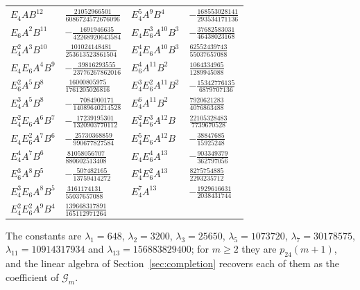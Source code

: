 \documentclass[11pt]{amsart}
\theoremstyle{definition}
\newcommand{\pf}{p_{24}}
\begin{document}
{\small\begin{tabular}{@{}l@{\ \ }l@{\qquad}l@{\ \ }l@{}}
$E_4 A B^{12}$ & $\tfrac{21052966501}{6086724572676096}$ & $E_4^{5} A^{9} B^{4}$ & $-\tfrac{168553028141}{293534171136}$ \\
$E_6 A^{2} B^{11}$ & $-\tfrac{1691946635}{42268920643584}$ & $E_4 E_6^{3} A^{10} B^{3}$ & $-\tfrac{37682583031}{46438023168}$ \\
$E_4^{2} A^{3} B^{10}$ & $\tfrac{101024148481}{253613523861504}$ & $E_4^{4} E_6 A^{10} B^{3}$ & $\tfrac{62552439743}{55037657088}$ \\
$E_4 E_6 A^{4} B^{9}$ & $-\tfrac{39816293555}{23776267862016}$ & $E_6^{4} A^{11} B^{2}$ & $\tfrac{1064334965}{1289945088}$ \\
$E_6^{2} A^{5} B^{8}$ & $\tfrac{16000805975}{1761205026816}$ & $E_4^{3} E_6^{2} A^{11} B^{2}$ & $-\tfrac{15342776135}{6879707136}$ \\
$E_4^{3} A^{5} B^{8}$ & $-\tfrac{7084900171}{14089640214528}$ & $E_4^{6} A^{11} B^{2}$ & $\tfrac{7920621283}{4076863488}$ \\
$E_4^{2} E_6 A^{6} B^{7}$ & $-\tfrac{17239195301}{1320903770112}$ & $E_4^{2} E_6^{3} A^{12} B$ & $\tfrac{22105328483}{7739670528}$ \\
$E_4 E_6^{2} A^{7} B^{6}$ & $-\tfrac{25730368859}{990677827584}$ & $E_4^{5} E_6 A^{12} B$ & $-\tfrac{38847685}{15925248}$ \\
$E_4^{4} A^{7} B^{6}$ & $\tfrac{81058056707}{880602513408}$ & $E_4 E_6^{4} A^{13}$ & $-\tfrac{903349379}{362797056}$ \\
$E_6^{3} A^{8} B^{5}$ & $-\tfrac{507482165}{13759414272}$ & $E_4^{4} E_6^{2} A^{13}$ & $\tfrac{8275754885}{2293235712}$ \\
$E_4^{3} E_6 A^{8} B^{5}$ & $\tfrac{3161174131}{55037657088}$ & $E_4^{7} A^{13}$ & $-\tfrac{1929616631}{2038431744}$ \\
$E_4^{2} E_6^{2} A^{9} B^{4}$ & $\tfrac{139668317891}{165112971264}$ & & \\
\end{tabular}}\par\medskip

The constants are $\lambda_1=648$, $\lambda_2=3200$, $\lambda_3=25650$, $\lambda_5=1073720$, $\lambda_7=30178575$, $\lambda_{11}=10914317934$ and $\lambda_{13}=156883829400$; for $m\ge2$ they are $\pf(m+1)$, and the linear algebra of Section~\ref{sec:completion} recovers each of them as the coefficient of $\mathcal G_m$.
\end{document}
